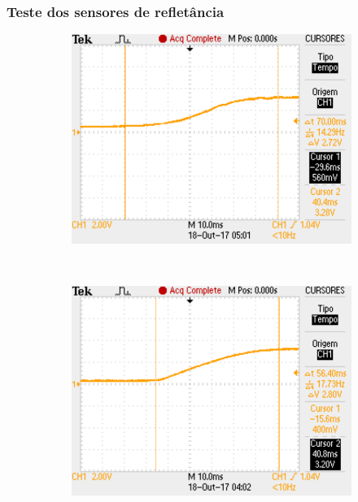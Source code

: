 \begin{frame}
\frametitle{Teste dos sensores de refletância}
\begin{figure}[h]
     \centering
     \captionsetup{width=0.8\textwidth,font=footnotesize,textfont=bf}
     \begin{subfigure}[b]{0.3\textwidth}
 	\centering
         \includegraphics[width=\textwidth,height=\textheight,keepaspectratio]{figuras/TesteNew2mm.pdf}
         \caption{\centering \label{fig:TesteNew2mm}}
     \end{subfigure}
     ~
     \begin{subfigure}[b]{0.3\textwidth}
 	\centering
         \includegraphics[width=\textwidth,height=5\textheight,keepaspectratio]{figuras/TesteOld2mm.pdf}
         \caption{\centering \label{fig:TesteOld2mm}}
     \end{subfigure}
     

\end{figure}
\end{frame}
